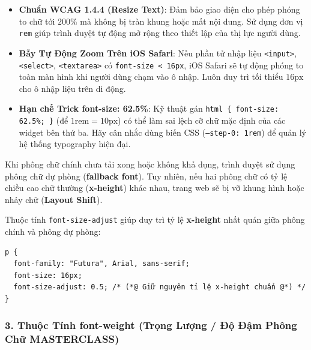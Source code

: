 \documentclass[11pt,oneside]{book}
\newcommand{\codeinline}[1]{\textcolor{accentOrange}{\texttt{#1}}}
\newcommand{\term}[1]{\textbf{\textcolor{primaryBlue}{#1}}}
\begin{document}
\begin{warnBox}
\begin{itemize}[leftmargin=1.5em, itemsep=3pt, parsep=0pt]
    \item \textbf{Chuẩn WCAG 1.4.4 (Resize Text)}: Đảm bảo giao diện cho phép phóng to chữ tới $200\%$ mà không bị tràn khung hoặc mất nội dung. Sử dụng đơn vị \codeinline{rem} giúp trình duyệt tự động mở rộng theo thiết lập của thị lực người dùng.
    \item \textbf{Bẫy Tự Động Zoom Trên iOS Safari}: Nếu phần tử nhập liệu \codeinline{<input>}, \codeinline{<select>}, \codeinline{<textarea>} có \codeinline{font-size < 16px}, iOS Safari sẽ tự động phóng to toàn màn hình khi người dùng chạm vào ô nhập. Luôn duy trì tối thiểu $16\text{px}$ cho ô nhập liệu trên di động.
    \item \textbf{Hạn chế Trick font-size: 62.5\%}: Kỹ thuật gán \codeinline{html \{ font-size: 62.5\%; \}} (để $1\text{rem} = 10\text{px}$) có thể làm sai lệch cỡ chữ mặc định của các widget bên thứ ba. Hãy cân nhắc dùng biến CSS (\codeinline{--step-0: 1rem}) để quản lý hệ thống typography hiện đại.
\end{itemize}
\end{warnBox}

\begin{conceptBox}
Khi phông chữ chính chưa tải xong hoặc không khả dụng, trình duyệt sử dụng phông chữ dự phòng (\term{fallback font}). Tuy nhiên, nếu hai phông chữ có tỷ lệ chiều cao chữ thường (\term{x-height}) khác nhau, trang web sẽ bị vỡ khung hình hoặc nhảy chữ (\term{Layout Shift}).

Thuộc tính \codeinline{font-size-adjust} giúp duy trì tỷ lệ \term{x-height} nhất quán giữa phông chính và phông dự phòng:
\begin{codeWindow}
\begin{lstlisting}[language=CSS3]
p {
  font-family: "Futura", Arial, sans-serif;
  font-size: 16px;
  font-size-adjust: 0.5; /* (*@ Giữ nguyên tỉ lệ x-height chuẩn @*) */
}
\end{lstlisting}
\end{codeWindow}
\end{conceptBox}

\subsubsection{3. Thuộc Tính font-weight (Trọng Lượng / Độ Đậm Phông Chữ MASTERCLASS)}
\label{sec:font_weight}
\end{document}
